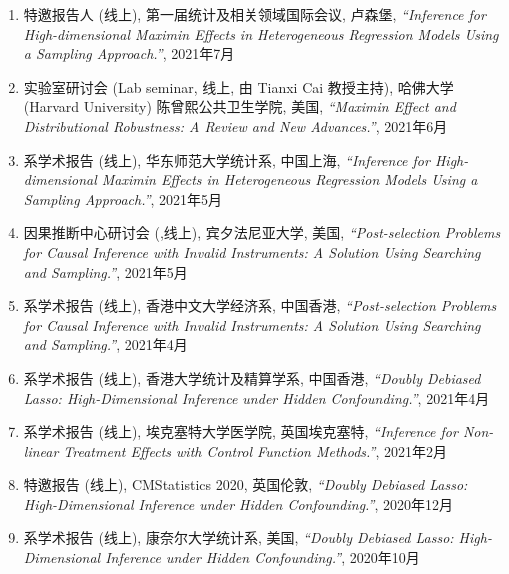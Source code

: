 \documentclass[margin, line]{res}
\begin{document}
\begin{resume}
\begin{enumerate}
            \item 特邀报告人 (线上), 第一届统计及相关领域国际会议, 卢森堡, 
                {\it ``Inference for High-dimensional Maximin Effects in Heterogeneous Regression Models Using a Sampling Approach.''}, 
                2021年7月

            \item 实验室研讨会 (Lab seminar, 线上, 由 Tianxi Cai 教授主持), 哈佛大学 (Harvard University) 陈曾熙公共卫生学院, 美国, {\it ``Maximin Effect and Distributional Robustness: A Review and New Advances.''}, 
                2021年6月

            \item 系学术报告 (线上), 华东师范大学统计系, 中国上海, 
                {\it ``Inference for High-dimensional Maximin Effects in Heterogeneous Regression Models Using a Sampling Approach.''}, 
                2021年5月

            \item 因果推断中心研讨会 (,线上), 宾夕法尼亚大学, 美国, 
                {\it ``Post-selection Problems for Causal Inference with Invalid Instruments: A Solution Using Searching and Sampling.''}, 
                2021年5月

            \item 系学术报告 (线上), 香港中文大学经济系, 中国香港, 
                {\it ``Post-selection Problems for Causal Inference with Invalid Instruments: A Solution Using Searching and Sampling.''}, 
                2021年4月

            \item 系学术报告 (线上), 香港大学统计及精算学系, 中国香港, 
                {\it ``Doubly Debiased Lasso: High-Dimensional Inference under Hidden Confounding.''}, 
                2021年4月

            \item 系学术报告 (线上), 埃克塞特大学医学院, 英国埃克塞特, 
                {\it ``Inference for Non-linear Treatment Effects with Control Function Methods.''}, 
                2021年2月

			\item 特邀报告 (线上), CMStatistics 2020, 英国伦敦, {\it ``Doubly Debiased Lasso: High-Dimensional Inference under Hidden Confounding.''}, 
                2020年12月

            \item 系学术报告 (线上), 康奈尔大学统计系, 美国, {\it ``Doubly Debiased Lasso: High-Dimensional Inference under Hidden Confounding.''}, 
                2020年10月


\end{enumerate}
\end{resume}
\end{document}
